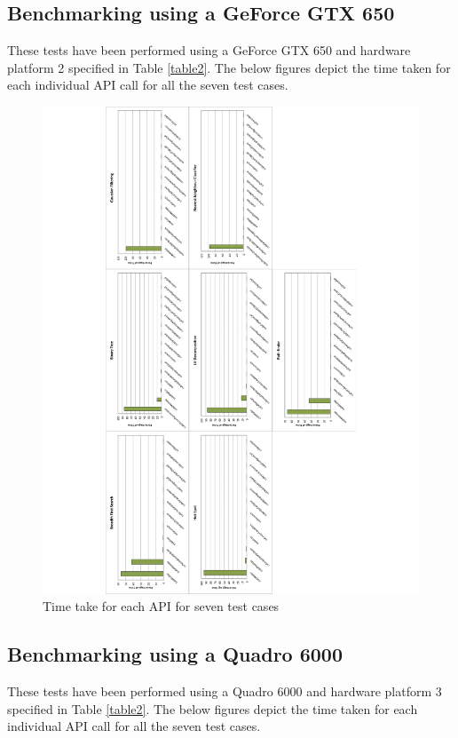 \documentclass[paper=a4, fontsize=11pt]{scrartcl}
\numberwithin{equation}{section}		%
\numberwithin{figure}{section}			%
\numberwithin{table}{section}				%
\begin{document}
\newpage
\subsection{Benchmarking using a GeForce GTX 650}
These tests have been performed using a GeForce GTX 650 and hardware platform 2 specified in Table \ref{table2}. The below figures depict the time taken for each individual API call for all the seven test cases.

\begin{figure}[!h]
\centering
\includegraphics[scale=0.6]{../imgs/x650.pdf}
\caption{Time take for each API for seven test cases}
\label{fig:x650}
\end{figure}

\newpage
\subsection{Benchmarking using a Quadro 6000}
These tests have been performed using a Quadro 6000 and hardware platform 3 specified in Table \ref{table2}. The below figures depict the time taken for each individual API call for all the seven test cases.
\end{document}
